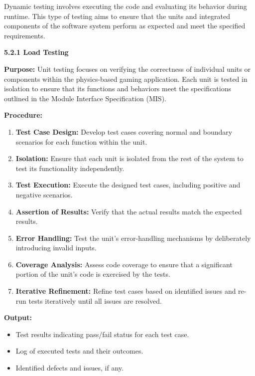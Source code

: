 \documentclass[
]{article}
\begin{document}
Dynamic testing involves executing the code and evaluating its behavior
during runtime. This type of testing aims to ensure that the units and
integrated components of the software system perform as expected and
meet the specified requirements.

\protect\hypertarget{Ad4}{}{}\textbf{5.2.1 Load Testing}

\textbf{Purpose:} Unit testing focuses on verifying the correctness of
individual units or components within the physics-based gaming
application. Each unit is tested in isolation to ensure that its
functions and behaviors meet the specifications outlined in the Module
Interface Specification (MIS).

\textbf{Procedure:}

\begin{enumerate}
\def\labelenumi{\arabic{enumi}.}
\item
  \textbf{Test Case Design:} Develop test cases covering normal and
  boundary scenarios for each function within the unit.
\item
  \textbf{Isolation:} Ensure that each unit is isolated from the rest of
  the system to test its functionality independently.
\item
  \textbf{Test Execution:} Execute the designed test cases, including
  positive and negative scenarios.
\item
  \textbf{Assertion of Results:} Verify that the actual results match
  the expected results.
\item
  \textbf{Error Handling:} Test the unit's error-handling mechanisms by
  deliberately introducing invalid inputs.
\item
  \textbf{Coverage Analysis:} Assess code coverage to ensure that a
  significant portion of the unit's code is exercised by the tests.
\item
  \textbf{Iterative Refinement:} Refine test cases based on identified
  issues and re-run tests iteratively until all issues are resolved.
\end{enumerate}

\textbf{Output:}

\begin{itemize}
\item
  Test results indicating pass/fail status for each test case.
\item
  Log of executed tests and their outcomes.
\item
  Identified defects and issues, if any.
\end{itemize}
\end{document}
